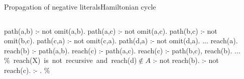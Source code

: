\begin{frame}{Propagation of negative literals}{Hamiltonian cycle}
  \medskip
  \begin{columns}
    \begin{column}{0.45\textwidth}
    \begin{minipage}{.4\textwidth}\small
      \begin{semiverbatim}
path(a,b) :- not omit(a,b).
path(a,c) :- not omit(a,c).
path(b,c) :- not omit(b,c).
path(c,a) :- not omit(c,a).
path(d,a) :- not omit(d,a).
...
\alert{reach(a)}.
\alert{reach(b)} :- path(a,b).
\alert{reach(c)} :- path(a,c).
\alert{reach(c)} :- path(b,c), reach(b).
...
\mbox{{\color{comment}\% reach(X) is not recursive and reach(d)\({}\not\in{}A\)}}
:- not reach(b).
:- not reach(c).
:- . \color{comment}\% 
      \end{semiverbatim}
    \end{minipage}
    \end{column}
    \begin{column}[t]{0.45\textwidth}
      \centering
      \Graph[draw=none]
    \end{column}
  \end{columns}
\end{frame}
